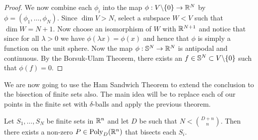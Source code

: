\begin{proof}
We now combine each $\phi_i$ into the map $\phi : V\backslash \{0\} \to \mathbb R^N$ by $\phi = (\phi_1, \dots, \phi_N)$.
 Since $\dim V > N$, select a subspace $W < V$ such that $\dim W = N+1$. 
Now choose an isomorphism of $W$ with $\mathbb R^{N+1}$ and notice that since for all $\lambda >0$ we have $\phi (\lambda x) = \phi(x)$ and hence that $\phi$ is simply a function on the unit sphere. 
Now the map $\phi: \mathbb S^N \to \mathbb R^N$ is antipodal and continuous. 
By the Borsuk-Ulam Theorem, there exists an $f\in \mathbb S^N \subset V\backslash \{0\}$ such that $\phi(f) = 0$.
\end{proof}
We are now going to use the Ham Sandwich Theorem to extend the conclusion to the bisection of finite sets also.
The main idea will be to replace each of our points in the finite set with $\delta$-balls and apply the previous theorem.
\begin{corollary}
    Let $S_1, \dots , S_N$ be finite sets in $\mathbb R^n$ and let $D$ be such that $N < {{D+n}\choose{n}}$. 
    Then there exists a non-zero $P\in \operatorname{Poly}_D (\mathbb R^n)$ that bisects each $S_i$.  \label{thm:FiniteHamSandwich} 
\end{corollary}

